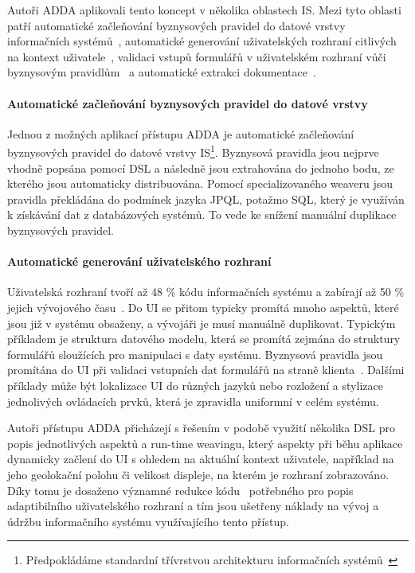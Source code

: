 Autoři \gls{ADDA} aplikovali tento koncept v několika oblastech \gls{IS}.
Mezi tyto oblasti patří automatické začleňování byznysových pravidel
do datové vrstvy informačních systémů~\cite{cemus2015automated}, automatické
generování uživatelských rozhraní citlivých na kontext uživatele~\cite{cemus2017separation},
validaci vstupů formulářů v uživatelském rozhraní vůči byznysovým pravidlům~\cite{cemus2016context}\cite{cemus2017separation}
a automatické extrakci dokumentace~\cite{cemus2017automated}.

\paragraph{Automatické začleňování byznysových pravidel do datové vrstvy}

Jednou z možných aplikací přístupu \gls{ADDA} je automatické začleňování
byznysových pravidel do datové vrstvy \gls{IS}\footnote{Předpokládáme standardní
třívrstvou architekturu informačních systémů~\cite{fowler2002patterns}}.
Byznysová pravidla jsou nejprve vhodně popsána pomocí \gls{DSL} a následně jsou
extrahována do jednoho bodu, ze kterého jsou automaticky distribuována.
Pomocí specializovaného weaveru jsou pravidla překládána do podmínek
jazyka \gls{JPQL}, potažmo \gls{SQL}, který je využíván k získávání dat
z databázových systémů. To vede ke snížení manuální duplikace byznysových
pravidel.

\paragraph{Automatické generování uživatelského rozhraní}

Uživatelská rozhraní tvoří až 48 \% kódu informačních systému
a zabírají až 50 \% jejich vývojového času~\cite{kennard2009separation}.
Do \gls{UI} se přitom typicky promítá mnoho aspektů, které jsou
již v systému obsaženy, a vývojáři je musí manuálně duplikovat.
Typickým příkladem je struktura datového modelu, která se promítá
zejmána do struktury formulářů sloužících pro manipulaci s daty systému.
Byznysová pravidla jsou promítána do \gls{UI} při validaci vstupních
dat formulářů na straně klienta~\cite{cemus2017separation}.
Dalšími příklady může být lokalizace \gls{UI} do různých jazyků
nebo rozložení a stylizace jednolivých ovládacích prvků, která
je zpravidla uniformní v celém systému.

Autoři přístupu \gls{ADDA} přicházejí s řešením v podobě
využití několika \gls{DSL} pro popis jednotlivých aspektů
a run-time weavingu, který aspekty při běhu aplikace
dynamicky začlení do \gls{UI} s ohledem na aktuální kontext
uživatele, například na jeho geolokační polohu či velikost
displeje, na kterém je rozhraní zobrazováno.
Díky tomu je dosaženo významné redukce kódu~\cite{cemus2016context}
potřebného pro popis adaptibilního uživatelského rozhraní
a tím jsou ušetřeny náklady na vývoj a údržbu informačního
systému využívajícího tento přístup.

